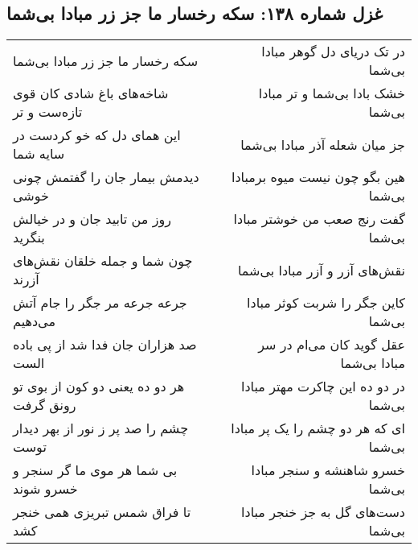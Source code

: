 \begin{center}
\section*{غزل شماره ۱۳۸: سکه رخسار ما جز زر مبادا بی‌شما}
\label{sec:0138}
\begin{longtable}{l p{0.5cm} r}
سکه رخسار ما جز زر مبادا بی‌شما
&&
در تک دریای دل گوهر مبادا بی‌شما
\\
شاخه‌های باغ شادی کان قوی تازه‌ست و تر
&&
خشک بادا بی‌شما و تر مبادا بی‌شما
\\
این همای دل که خو کردست در سایه شما
&&
جز میان شعله آذر مبادا بی‌شما
\\
دیدمش بیمار جان را گفتمش چونی خوشی
&&
هین بگو چون نیست میوه برمبادا بی‌شما
\\
روز من تابید جان و در خیالش بنگرید
&&
گفت رنج صعب من خوشتر مبادا بی‌شما
\\
چون شما و جمله خلقان نقش‌های آزرند
&&
نقش‌های آزر و آزر مبادا بی‌شما
\\
جرعه جرعه مر جگر را جام آتش می‌دهیم
&&
کاین جگر را شربت کوثر مبادا بی‌شما
\\
صد هزاران جان فدا شد از پی باده الست
&&
عقل گوید کان می‌ام در سر مبادا بی‌شما
\\
هر دو ده یعنی دو کون از بوی تو رونق گرفت
&&
در دو ده این چاکرت مهتر مبادا بی‌شما
\\
چشم را صد پر ز نور از بهر دیدار توست
&&
ای که هر دو چشم را یک پر مبادا بی‌شما
\\
بی شما هر موی ما گر سنجر و خسرو شوند
&&
خسرو شاهنشه و سنجر مبادا بی‌شما
\\
تا فراق شمس تبریزی همی خنجر کشد
&&
دست‌های گل به جز خنجر مبادا بی‌شما
\\
\end{longtable}
\end{center}
